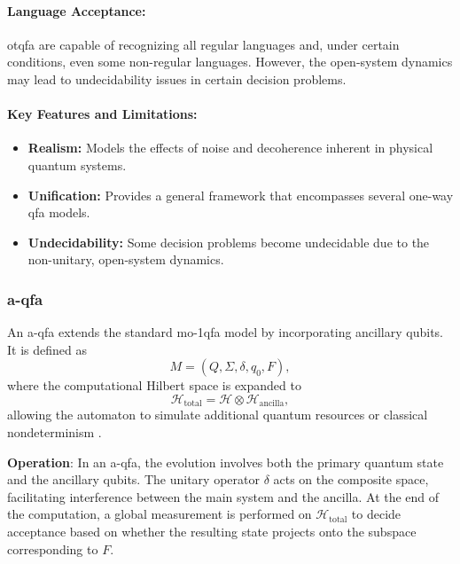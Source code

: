 \paragraph{Language Acceptance:}  
\gls{otqfa} are capable of recognizing all regular languages and, under certain conditions, even some non-regular languages. However, the open-system dynamics may lead to undecidability issues in certain decision problems.

\paragraph{Key Features and Limitations:}
\begin{itemize}
    \item \textbf{Realism:} Models the effects of noise and decoherence inherent in physical quantum systems.
    \item \textbf{Unification:} Provides a general framework that encompasses several one-way \gls{qfa} models.
    \item \textbf{Undecidability:} Some decision problems become undecidable due to the non-unitary, open-system dynamics.
\end{itemize}

\subsubsection{\acrfull{a-qfa}}
\label{sssec:a-qfa}
\begin{definition}
An \gls{a-qfa} extends the standard \gls{mo-1qfa} model by incorporating ancillary qubits. It is defined as 
\[
M = (Q, \Sigma, \delta, q_0, F),
\]
where the computational Hilbert space is expanded to 
\[
\mathcal{H}_{\text{total}} = \mathcal{H} \otimes \mathcal{H}_{\text{ancilla}},
\]
allowing the automaton to simulate additional quantum resources or classical nondeterminism \cite{paschen2000quantum}.
\end{definition}

\textbf{Operation}:  
In an \gls{a-qfa}, the evolution involves both the primary quantum state and the ancillary qubits. The unitary operator \(\delta\) acts on the composite space, facilitating interference between the main system and the ancilla. At the end of the computation, a global measurement is performed on \(\mathcal{H}_{\text{total}}\) to decide acceptance based on whether the resulting state projects onto the subspace corresponding to \( F \).

